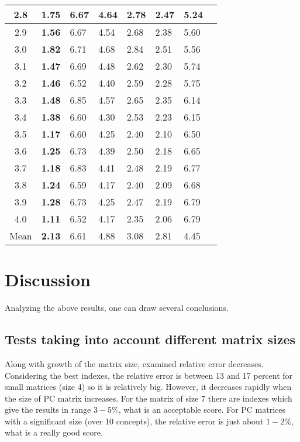 \begin{table}[!]
\begin{center}
\begin{tabular}{|c||lllll||l|c|}
2.8 & \textbf{1.75} & 6.67 & 4.64 & 2.78 & 2.47 & 5.24 \\ \hline
2.9 & \textbf{1.56} & 6.67 & 4.54 & 2.68 & 2.38 & 5.60 \\ \hline
3.0 & \textbf{1.82} & 6.71 & 4.68 & 2.84 & 2.51 & 5.56 \\ \hline
3.1 & \textbf{1.47} & 6.69 & 4.48 & 2.62 & 2.30 & 5.74 \\ \hline
3.2 & \textbf{1.46} & 6.52 & 4.40 & 2.59 & 2.28 & 5.75 \\ \hline
3.3 & \textbf{1.48} & 6.85 & 4.57 & 2.65 & 2.35 & 6.14 \\ \hline
3.4 & \textbf{1.38} & 6.60 & 4.30 & 2.53 & 2.23 & 6.15 \\ \hline
3.5 & \textbf{1.17} & 6.60 & 4.25 & 2.40 & 2.10 & 6.50 \\ \hline
3.6 & \textbf{1.25} & 6.73 & 4.39 & 2.50 & 2.18 & 6.65 \\ \hline
3.7 & \textbf{1.18} & 6.83 & 4.41 & 2.48 & 2.19 & 6.77 \\ \hline
3.8 & \textbf{1.24} & 6.59 & 4.17 & 2.40 & 2.09 & 6.68 \\ \hline
3.9 & \textbf{1.28} & 6.73 & 4.25 & 2.47 & 2.19 & 6.79 \\ \hline
4.0 & \textbf{1.11} & 6.52 & 4.17 & 2.35 & 2.06 & 6.79 \\ \hline \hline
Mean & \textbf{2.13} & 6.61 & 4.88 & 3.08 & 2.81 & 4.45 \\ \hline 
\end{tabular}
\end{center}
\end{table}


\section{Discussion}
Analyzing the above results, one can draw several conclusions.

\subsection{Tests taking into account different matrix sizes}
Along with growth of the matrix size, examined relative error decreases. Considering the best indexes, the relative error is between 13 and 17 percent for small matrices (size 4) so it is relatively big. However, it decreases rapidly when the size of PC matrix increases. For the matrix of size 7 there are indexes which give the results in range $3 - 5 \%$, what is an acceptable score. For PC matrices with a significant size (over 10 concepts), the relative error is just about $1 - 2 \%$, what is a really good score.

